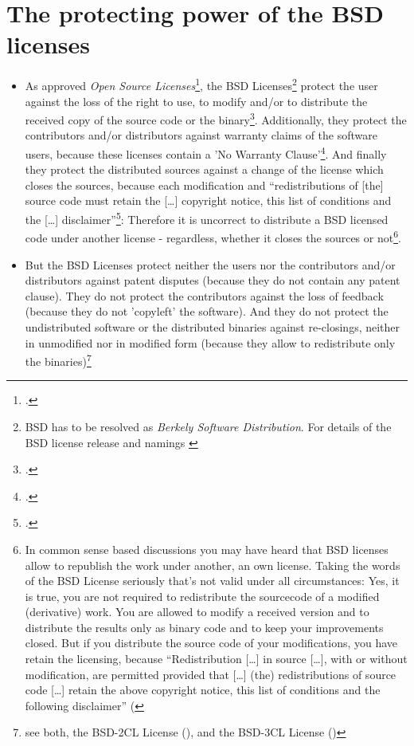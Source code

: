 \section{The protecting power of the BSD licenses}
\begin{itemize}
  \item As approved \emph{Open Source Licenses}\footcite[cf.][\nopage
  wp]{OSI2012b}, the BSD Licenses\footnote{BSD has to be resolved as
  \emph{Berkely Software Distribution}. For details of the BSD license release
  and namings \cite[cf.][\nopage wp. editorial]{BsdLicense3Clause}} protect the
  user against the loss of the right to use, to modify and/or to distribute the
  received copy of the source code or the binary\footcite[cf.][\nopage wp
  §1ff]{OSI2012a}. Additionally, they protect the contributors and/or
  distributors against warranty claims of the software users, because these
  licenses contain a 'No Warranty Clause'\footcite[one for all version
  cf.][\nopage wp]{BsdLicense2Clause}. And finally they protect the distributed
  sources against a change of the license which closes the sources, because each
  modification and \enquote{redistributions of [the] source code must retain the
  [\ldots] copyright notice, this list of conditions and the [\ldots]
  disclaimer}\footcite[cf.][\nopage wp]{BsdLicense2Clause}: Therefore it is
  uncorrect to distribute a BSD licensed code under another license - regardless,
  whether it closes the sources or not\footnote{In common sense based discussions
  you may have heard that BSD licenses allow to republish the work under
  another, an own license. Taking the words of the BSD License seriously that's
  not valid under all circumstances: Yes, it is true, you are not required to 
  redistribute the sourcecode of a modified (derivative) work. You are allowed 
  to modify a received version and to distribute the results only as binary code 
  and to keep your improvements closed. But if you distribute the source code of 
  your modifications, you have retain the licensing, because 
  \enquote{Redistribution [\ldots] in source [\ldots], with or without 
  modification, are permitted provided that [\ldots] (the) redistributions of 
  source code [\ldots] retain the above copyright notice, this list of 
  conditions and the following disclaimer} 
  (\cite[cf.][\nopage wp]{BsdLicense2Clause}}.
  
  \item But the BSD Licenses protect neither the users nor the contributors
  and/or distributors against patent disputes (because they do not contain any
  patent clause). They do not protect the contributors against the loss of
  feedback (because they do not 'copyleft' the software). And they do not
  protect the undistributed software or the distributed binaries against
  re-closings, neither in unmodified nor in modified form (because they allow to
  redistribute only the binaries)\footnote{see both, the BSD-2CL License
  (\cite[cf.][\nopage wp]{BsdLicense2Clause}), and the BSD-3CL License
  (\cite[cf.][\nopage wp]{BsdLicense3Clause})}
  
\end{itemize}

